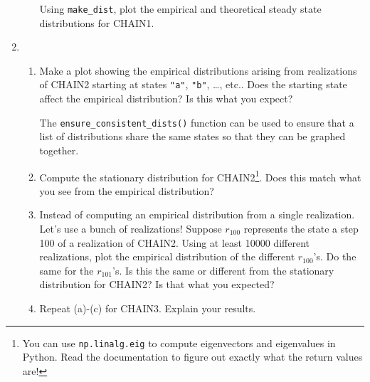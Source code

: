 \documentclass[letter]{article}
\begin{document}
\begin{enumerate}
\begin{enumerate}
				Using \verb|make_dist|, plot the empirical and theoretical steady state distributions for CHAIN1.
		\end{enumerate}

		\item
			\begin{enumerate}
				\item Make a plot showing the empirical distributions arising from realizations of CHAIN2 starting
					at states {\tt "a"}, {\tt "b"}, \ldots, etc.. Does the starting state affect the empirical
					distribution? Is this what you expect?

					The \verb|ensure_consistent_dists()| function can be used to ensure that a list of distributions
					share the same states so that they can be graphed together.
				\item Compute the stationary distribution for CHAIN2\footnote{ You can use {\tt np.linalg.eig}
					to compute eigenvectors and eigenvalues in Python. Read the documentation to figure out exactly
					what the return values are!}. Does this match what you see from the empirical distribution?
				\item Instead of computing an empirical distribution from a single realization. Let's use a bunch of realizations!
					Suppose $r_{100}$ represents the state a step 100 of a realization of CHAIN2. Using at least 10000
					different realizations, plot the empirical distribution of the different $r_{100}$'s. Do
					the same for the $r_{101}$'s. Is this the same
					or different from the stationary distribution for CHAIN2? Is that what you expected?
				\item Repeat (a)-(c) for CHAIN3. Explain your results.
			\end{enumerate}


\end{enumerate}
\end{document}
